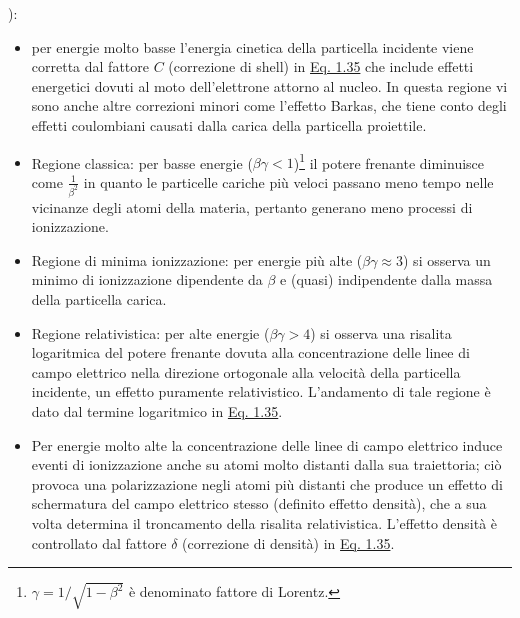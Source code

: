 \documentclass[12pt,a4paper,twoside]{report}
\begin{document}
	):
	\begin{itemize}
		\item per energie molto basse l'energia cinetica della particella incidente viene corretta dal fattore $C$ (correzione di shell) in \hyperref[eq:bethe_bloch]{Eq. 1.35} che include effetti energetici dovuti al moto dell'elettrone attorno al nucleo. In questa regione vi sono anche altre correzioni minori come l'effetto Barkas, che tiene conto degli effetti coulombiani causati dalla carica della particella proiettile.
		\item Regione classica: per basse energie ($\beta\gamma<1$)\footnote{$\gamma=1/\sqrt{1-\beta^2}$ è denominato fattore di Lorentz.} il potere frenante diminuisce come $\frac{1}{\beta^2}$ in quanto le particelle cariche più veloci passano meno tempo nelle vicinanze degli atomi della materia, pertanto generano meno processi di ionizzazione.
		\item Regione di minima ionizzazione: per energie più alte ($\beta\gamma\approx3$) si osserva un minimo di ionizzazione dipendente da $\beta$ e (quasi) indipendente dalla massa della particella carica.
		\item Regione relativistica: per alte energie ($\beta\gamma>4$) si osserva una risalita logaritmica del potere frenante dovuta alla concentrazione delle linee di campo elettrico nella direzione ortogonale alla velocità della particella incidente, un effetto puramente relativistico. L'andamento di tale regione è dato dal termine logaritmico in \hyperref[eq:bethe_bloch]{Eq. 1.35}.
		\item Per energie molto alte la concentrazione delle linee di campo elettrico induce eventi di ionizzazione anche su atomi molto distanti dalla sua traiettoria; ciò provoca una polarizzazione negli atomi più distanti che produce un effetto di schermatura del campo elettrico stesso (definito effetto densità), che a sua volta determina il troncamento della risalita relativistica. L'effetto densità è controllato dal fattore $\delta$ (correzione di densità) in \hyperref[eq:bethe_bloch]{Eq. 1.35}.
	\end{itemize}
\end{document}
